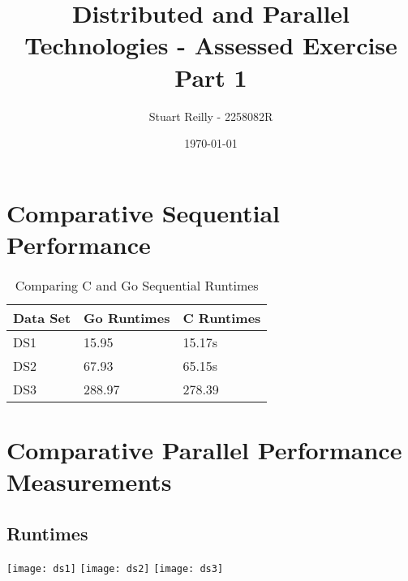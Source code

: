 \documentclass[11pt,a4paper,titlepage]{article}
\begin{document}
\title{Distributed and Parallel Technologies - Assessed Exercise Part 1}
\author{Stuart Reilly - 2258082R}
\date{\today}
\maketitle

\section{Comparative Sequential Performance}

\begin{table}[h]
	\centering
	\begin{tabular}{|l|l|l|}
		\hline
		Data Set & Go Runtimes & C Runtimes \\ \hline
		DS1 & 15.95 & 15.17s \\ \hline
		DS2 & 67.93 & 65.15s \\ \hline
		DS3 & 288.97 & 278.39 \\ \hline
	\end{tabular}
	\caption{Comparing C and Go Sequential Runtimes}
\end{table}

\section{Comparative Parallel Performance Measurements}
\subsection{Runtimes}

\texttt{[image: ds1]}
\texttt{[image: ds2]}
\texttt{[image: ds3]}
\end{document}
